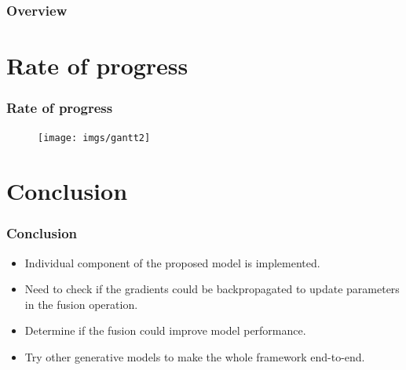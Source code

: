 \documentclass{beamer}
\begin{document}
\begin{frame}
\frametitle{Overview} %
\tableofcontents %
\end{frame}


\section{Rate of progress}
\begin{frame}
\frametitle{Rate of progress}
\begin{figure}
\centering
\texttt{[image: imgs/gantt2]}
\end{figure}
\end{frame}

\section{Conclusion}
\begin{frame}
\frametitle{Conclusion}
\begin{itemize}
\item Individual component of the proposed model is implemented.
\item Need to check if the gradients could be backpropagated to update parameters in the fusion operation.
\item Determine if the fusion could improve model performance.
\item Try other generative models to make the whole framework end-to-end.

\end{itemize}
\end{frame}
\end{document}

